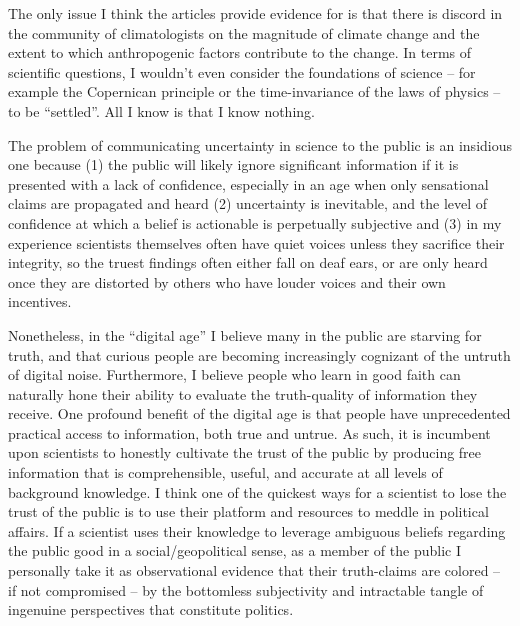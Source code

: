 \documentclass[12pt]{article}
\begin{document}
The only issue I think the articles provide evidence for is that there is discord in the community of climatologists on the magnitude of climate change and the extent to which anthropogenic factors contribute to the change. In terms of scientific questions, I wouldn't even consider the foundations of science -- for example the Copernican principle or the time-invariance of the laws of physics -- to be ``settled''. All I know is that I know nothing.

The problem of communicating uncertainty in science to the public is an insidious one because (1) the public will likely ignore significant information if it is presented with a lack of confidence, especially in an age when only sensational claims are propagated and heard (2) uncertainty is inevitable, and the level of confidence at which a belief is actionable is perpetually subjective and (3) in my experience scientists themselves often have quiet voices unless they sacrifice their integrity, so the truest findings often either fall on deaf ears, or are only heard once they are distorted by others who have louder voices and their own incentives.

Nonetheless, in the ``digital age'' I believe many in the public are starving for truth, and that curious people are becoming increasingly cognizant of the untruth of digital noise. Furthermore, I believe people who learn in good faith can naturally hone their ability to evaluate the truth-quality of information they receive. One profound benefit of the digital age is that people have unprecedented practical access to information, both true and untrue. As such, it is incumbent upon scientists to honestly cultivate the trust of the public by producing free information that is comprehensible, useful, and accurate at all levels of background knowledge. I think one of the quickest ways for a scientist to lose the trust of the public is to use their platform and resources to meddle in political affairs. If a scientist uses their knowledge to leverage ambiguous beliefs regarding the public good in a social/geopolitical sense, as a member of the public I personally take it as observational evidence that their truth-claims are colored -- if not compromised --  by the bottomless subjectivity and intractable tangle of ingenuine perspectives that constitute politics.
\end{document}
